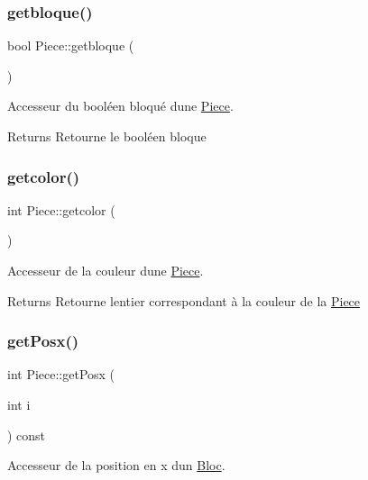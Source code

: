 \subsubsection{\texorpdfstring{getbloque()}{getbloque()}}
{\footnotesize\ttfamily bool Piece\+::getbloque (\begin{DoxyParamCaption}{ }\end{DoxyParamCaption})}



Accesseur du booléen bloqué d\textquotesingle{}une \hyperlink{classPiece}{Piece}. 

\begin{DoxyReturn}{Returns}
Retourne le booléen bloque 
\end{DoxyReturn}
\mbox{\label{classPiece_a2160d48bd04821ebbab32e14728360ad}} 
\subsubsection{\texorpdfstring{getcolor()}{getcolor()}}
{\footnotesize\ttfamily int Piece\+::getcolor (\begin{DoxyParamCaption}{ }\end{DoxyParamCaption})}



Accesseur de la couleur d\textquotesingle{}une \hyperlink{classPiece}{Piece}. 

\begin{DoxyReturn}{Returns}
Retourne l\textquotesingle{}entier correspondant à la couleur de la \hyperlink{classPiece}{Piece} 
\end{DoxyReturn}
\mbox{\label{classPiece_a0af5276d26a4bb2a6a42a3dab8b4783f}} 
\subsubsection{\texorpdfstring{get\+Posx()}{getPosx()}}
{\footnotesize\ttfamily int Piece\+::get\+Posx (\begin{DoxyParamCaption}\item[{int}]{i }\end{DoxyParamCaption}) const}



Accesseur de la position en x d\textquotesingle{}un \hyperlink{classBloc}{Bloc}. 


